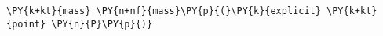 \begin{Verbatim}[commandchars=\\\{\}]
    \PY{k+kt}{mass} \PY{n+nf}{mass}\PY{p}{(}\PY{k}{explicit} \PY{k+kt}{point} \PY{n}{P}\PY{p}{)}
\end{Verbatim}
